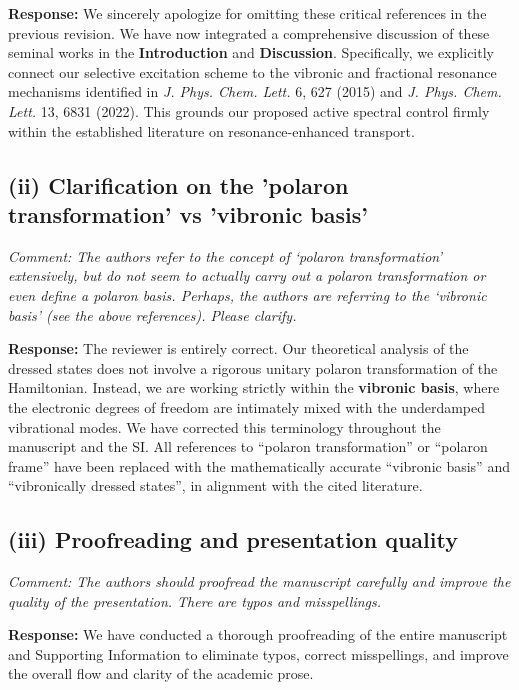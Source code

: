 \documentclass[11pt]{article}
\begin{document}
\textbf{Response:} We sincerely apologize for omitting these critical references in the previous revision. We have now integrated a comprehensive discussion of these seminal works in the \textbf{Introduction} and \textbf{Discussion}. Specifically, we explicitly connect our selective excitation scheme to the vibronic and fractional resonance mechanisms identified in \textit{J. Phys. Chem. Lett.} 6, 627 (2015) and \textit{J. Phys. Chem. Lett.} 13, 6831 (2022). This grounds our proposed active spectral control firmly within the established literature on resonance-enhanced transport.

\subsection*{(ii) Clarification on the 'polaron transformation' vs 'vibronic basis'}
\textit{Comment: The authors refer to the concept of ‘polaron transformation’ extensively, but do not seem to actually carry out a polaron transformation or even define a polaron basis. Perhaps, the authors are referring to the ‘vibronic basis’ (see the above references). Please clarify.}

\textbf{Response:} The reviewer is entirely correct. Our theoretical analysis of the dressed states does not involve a rigorous unitary polaron transformation of the Hamiltonian. Instead, we are working strictly within the \textbf{vibronic basis}, where the electronic degrees of freedom are intimately mixed with the underdamped vibrational modes. We have corrected this terminology throughout the manuscript and the SI. All references to ``polaron transformation'' or ``polaron frame'' have been replaced with the mathematically accurate ``vibronic basis'' and ``vibronically dressed states'', in alignment with the cited literature.

\subsection*{(iii) Proofreading and presentation quality}
\textit{Comment: The authors should proofread the manuscript carefully and improve the quality of the presentation. There are typos and misspellings.}

\textbf{Response:} We have conducted a thorough proofreading of the entire manuscript and Supporting Information to eliminate typos, correct misspellings, and improve the overall flow and clarity of the academic prose. 

\vspace{2em}
\end{document}
